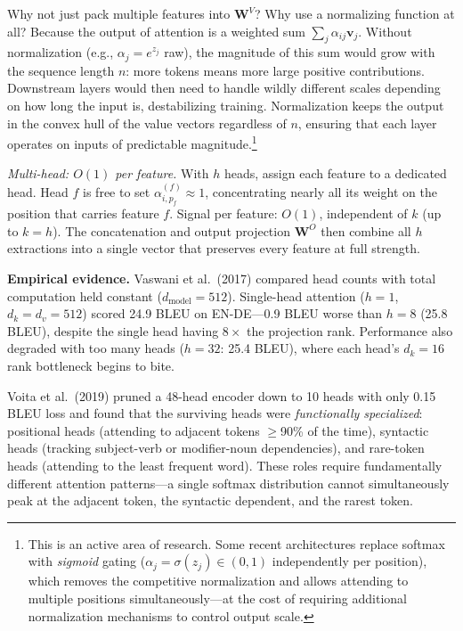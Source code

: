 \begin{whynotbox}{Why not just pack multiple features into $\mathbf{W}^V$?}
Why use a normalizing function at all? Because the output of attention is a weighted sum $\sum_j \alpha_{ij} \mathbf{v}_j$. Without normalization (e.g., $\alpha_j = e^{z_j}$ raw), the magnitude of this sum would grow with the sequence length $n$: more tokens means more large positive contributions. Downstream layers would then need to handle wildly different scales depending on how long the input is, destabilizing training. Normalization keeps the output in the convex hull of the value vectors regardless of $n$, ensuring that each layer operates on inputs of predictable magnitude.\footnote{This is an active area of research. Some recent architectures replace softmax with \emph{sigmoid} gating ($\alpha_j = \sigma(z_j) \in (0,1)$ independently per position), which removes the competitive normalization and allows attending to multiple positions simultaneously---at the cost of requiring additional normalization mechanisms to control output scale.}

\emph{Multi-head: $O(1)$ per feature.} With $h$ heads, assign each feature to a dedicated head. Head $f$ is free to set $\alpha_{i,p_f}^{(f)} \approx 1$, concentrating nearly all its weight on the position that carries feature $f$. Signal per feature: $O(1)$, independent of $k$ (up to $k = h$). The concatenation and output projection $\mathbf{W}^O$ then combine all $h$ extractions into a single vector that preserves every feature at full strength.

\textbf{Empirical evidence.} Vaswani et al.\ (2017) compared head counts with total computation held constant ($d_{\text{model}} = 512$). Single-head attention ($h = 1$, $d_k = d_v = 512$) scored 24.9 BLEU on EN-DE---0.9 BLEU worse than $h = 8$ (25.8 BLEU), despite the single head having $8\times$ the projection rank. Performance also degraded with too many heads ($h = 32$: 25.4 BLEU), where each head's $d_k = 16$ rank bottleneck begins to bite.

Voita et al.\ (2019) pruned a 48-head encoder down to 10 heads with only 0.15 BLEU loss and found that the surviving heads were \emph{functionally specialized}: positional heads (attending to adjacent tokens $\geq$90\% of the time), syntactic heads (tracking subject-verb or modifier-noun dependencies), and rare-token heads (attending to the least frequent word). These roles require fundamentally different attention patterns---a single softmax distribution cannot simultaneously peak at the adjacent token, the syntactic dependent, and the rarest token.


\end{whynotbox}
